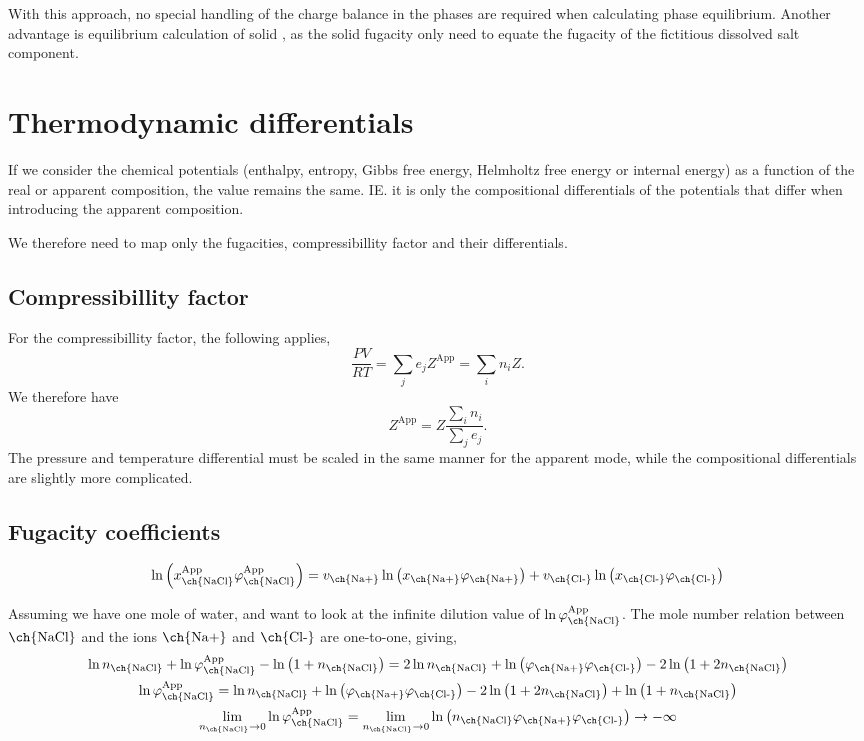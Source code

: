 \documentclass[english]{../thermomemo/thermomemo}
\newcommand{\lp}{\ensuremath{\left(}\xspace}
\newcommand{\rp}{\ensuremath{\right)}\xspace}
\newcommand{\app}{\ensuremath{\text{App}}\xspace}
\newcommand{\nacl}{\ensuremath{\text{\ch{NaCl}}}\xspace}
\newcommand{\na}{\ensuremath{\text{\ch{Na+}}}\xspace}
\newcommand{\cl}{\ensuremath{\text{\ch{Cl-}}}\xspace}
\begin{document}
With this approach, no special handling of the charge balance in the
phases are required when calculating phase equilibrium. Another
advantage is equilibrium calculation of solid , as the
solid fugacity only need to equate the fugacity of the fictitious
dissolved salt component.

\section{Thermodynamic differentials}

If we consider the chemical potentials (enthalpy, entropy, Gibbs free
energy, Helmholtz free energy or internal energy) as a function of the
real or apparent composition, the value remains the same. IE. it is
only the compositional differentials of the potentials that differ
when introducing the apparent composition.

We therefore need to map only the fugacities, compressibillity factor
and their differentials.

\subsection{Compressibillity factor}
For the compressibillity factor, the following applies,
\begin{equation}
  \frac{PV}{RT} = \sum_j e_j Z^\app = \sum_i n_i Z.
  \label{eq:compressibillity_factor_relation}
\end{equation}
We therefore have
\begin{equation}
  Z^\app = Z \frac{\sum_i n_i}{\sum_j e_j }.
  \label{eq:compressibillity_factor}
\end{equation}
The pressure and temperature differential must be scaled in the same
manner for the apparent mode, while the compositional differentials
are slightly more complicated.

\subsection{Fugacity coefficients}
\begin{equation}
  \ln \lp x_\nacl^\app \varphi_\nacl^\app \rp  = v_\na \ln \lp x_\na \varphi_\na \rp + v_\cl \ln \lp x_\cl \varphi_\cl \rp
\label{eq:fugacity_coeff}
\end{equation}

Assuming we have one mole of water, and want to look at the infinite
dilution value of $\ln \varphi_\nacl^\app$. The mole number relation between \nacl and the ions \na and \cl are one-to-one, giving,
\begin{gather}
  \ln n_\nacl + \ln \varphi_\nacl^\app - \ln \lp 1 + n_\nacl \rp  = 2 \ln n_\nacl + \ln \lp\varphi_\na\varphi_\cl\rp - 2\ln \lp 1 + 2 n_\nacl \rp \nonumber \\
  \ln \varphi_\nacl^\app = \ln n_\nacl + \ln \lp\varphi_\na\varphi_\cl\rp - 2\ln \lp 1 + 2 n_\nacl \rp + \ln \lp 1 + n_\nacl \rp \nonumber \\
  \lim_{n_\nacl \rightarrow 0}\ln \varphi_\nacl^\app = \lim_{n_\nacl \rightarrow 0} \ln \lp n_\nacl \varphi_\na\varphi_\cl\rp \rightarrow - \infty
\label{eq:fugacity_coeff_inf}
\end{gather}
\end{document}
